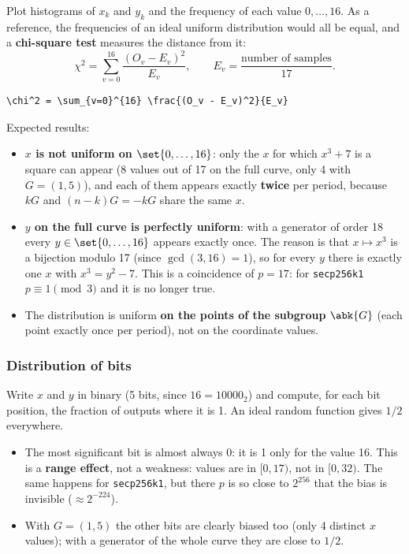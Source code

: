 Plot histograms of $x_k$ and $y_k$ and the frequency of each value $0, \ldots, 16$. As a reference, the frequencies of an ideal uniform distribution would all be equal, and a \textbf{chi-square test} measures the distance from it:
\[
  \chi^2 = \sum_{v=0}^{16} \frac{(O_v - E_v)^2}{E_v}, \qquad E_v = \frac{\text{number of samples}}{17}.
\]
\begin{lstlisting}[numbers=none]
\chi^2 = \sum_{v=0}^{16} \frac{(O_v - E_v)^2}{E_v}\end{lstlisting}

Expected results:
\begin{itemize}
  \item \textbf{$x$ is not uniform on $\set{0, \ldots, 16}$}: only the $x$ for which $x^3 + 7$ is a square can appear (8 values out of 17 on the full curve, only 4 with $G = (1,5)$), and each of them appears exactly \textbf{twice} per period, because $kG$ and $(n-k)G = -kG$ share the same $x$.
  \item \textbf{$y$ on the full curve is perfectly uniform}: with a generator of order 18 every $y \in \set{0, \ldots, 16}$ appears exactly once. The reason is that $x \mapsto x^3$ is a bijection modulo 17 (since $\gcd(3, 16) = 1$), so for every $y$ there is exactly one $x$ with $x^3 = y^2 - 7$. This is a coincidence of $p = 17$: for \texttt{secp256k1} $p \equiv 1 \pmod 3$ and it is no longer true.
  \item The distribution is uniform \textbf{on the points of the subgroup} $\abk{G}$ (each point exactly once per period), not on the coordinate values.
\end{itemize}

\subsubsection{Distribution of bits}

Write $x$ and $y$ in binary (5 bits, since $16 = 10000_2$) and compute, for each bit position, the fraction of outputs where it is 1. An ideal random function gives $1/2$ everywhere.

\begin{itemize}
  \item The most significant bit is almost always 0: it is 1 only for the value 16. This is a \textbf{range effect}, not a weakness: values are in $[0, 17)$, not in $[0, 32)$. The same happens for \texttt{secp256k1}, but there $p$ is so close to $2^{256}$ that the bias is invisible ($\approx 2^{-224}$).
  \item With $G = (1,5)$ the other bits are clearly biased too (only 4 distinct $x$ values); with a generator of the whole curve they are close to $1/2$.
\end{itemize}

